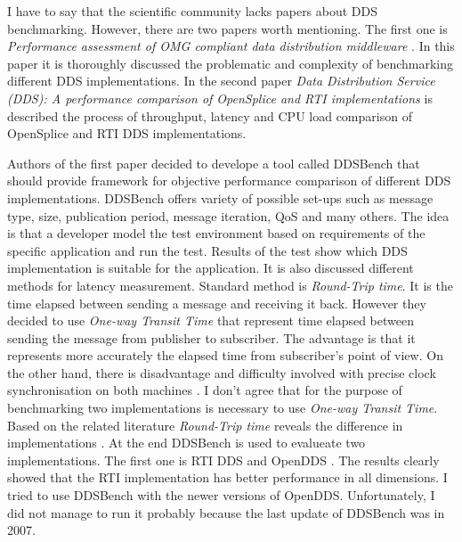 \documentclass{csfourzero}
\begin{document}
I have to say that the scientific community lacks papers about DDS benchmarking. However, there are two papers worth mentioning. The first one is \textit{Performance assessment of OMG compliant data distribution middleware} \cite{omg-perf}. In this paper it is thoroughly discussed the problematic and complexity of benchmarking different DDS implementations. In the second paper \textit{Data Distribution Service (DDS): A performance comparison of OpenSplice and RTI implementations} \cite{splice-vs-rti} is described the process of throughput, latency and CPU load comparison of OpenSplice and RTI DDS implementations.

Authors of the first paper decided to develope a tool called DDSBench that should provide framework for objective performance comparison of different DDS implementations. DDSBench offers variety of possible set-ups such as message type, size, publication period, message iteration, QoS and many others. The idea is that a developer model the test environment based on requirements of the specific application and run the test. Results of the test show which DDS implementation is suitable for the application. It is also discussed different methods for latency measurement. Standard method is \textit{Round-Trip time}. It is the time elapsed between sending a message and receiving it back. However they decided to use \textit{One-way Transit Time} that represent time elapsed between sending the message from publisher to subscriber. The advantage is that it represents more accurately the elapsed time from subscriber's point of view. On the other hand, there is disadvantage and difficulty involved with precise clock synchronisation on both machines  \cite{omg-perf}. I don't agree that for the purpose of benchmarking two implementations is necessary to use \textit{One-way Transit Time}. Based on the related literature \textit{Round-Trip time} reveals the difference in implementations \cite{perf-embedded}. At the end DDSBench is used to evalueate two implementations. The first one is RTI DDS and OpenDDS \cite{omg-perf}. The results clearly showed that the RTI implementation has better performance in all dimensions. I tried to use DDSBench with the newer versions of OpenDDS. Unfortunately, I did not manage to run it probably because the last update of DDSBench was in 2007.
\end{document}
